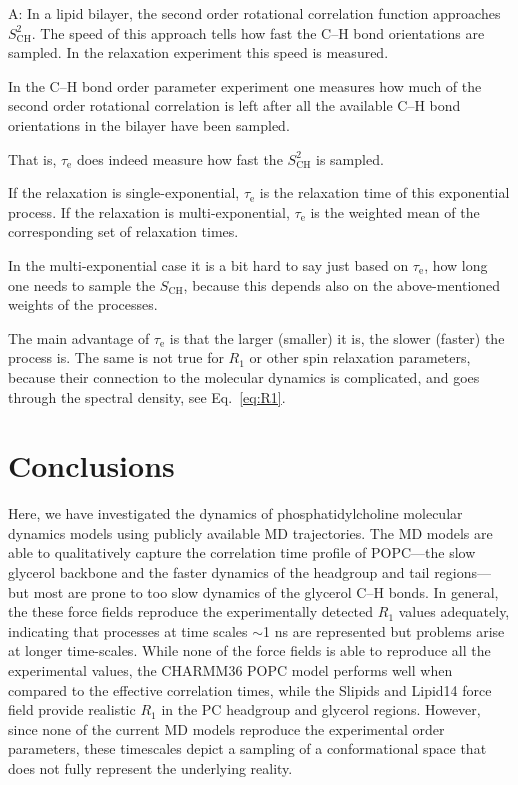 \documentclass[journal=jpcbfk,manuscript=article,layout=twocolumn]{achemso}
\begin{document}
A: In a lipid bilayer, the second order rotational correlation function approaches $S^2_\mathrm{CH}$. The speed of this approach tells how fast the C--H bond orientations are sampled. In the relaxation experiment this speed is measured.

In the C--H bond order parameter experiment one measures how much of the second order rotational correlation is left after all the available C--H bond orientations in the bilayer have been sampled.

That is,  $\tau_\mathrm e$ does indeed measure how fast the $S^2_\mathrm{CH}$ is sampled.

If the relaxation is single-exponential, $\tau_\mathrm e$ is the relaxation time of this exponential process. If the relaxation is multi-exponential, $\tau_\mathrm e$ is the weighted mean of the corresponding set of relaxation times.

In the multi-exponential case it is a bit hard to say just based on $\tau_\mathrm e$, how long one needs to sample the $S_\mathrm{CH}$, because this depends also on the above-mentioned weights of the processes.

The main advantage of $\tau_\mathrm e$ is that the larger (smaller) it is, the slower (faster) the process is. The same is not true for $R_1$ or other spin relaxation parameters, because their connection to the molecular dynamics is complicated, and goes through the spectral density, see Eq.~\eqref{eq:R1}.

\section{Conclusions}

Here, we have investigated the dynamics of phosphatidylcholine molecular dynamics models using publicly available MD trajectories. The MD models are able to qualitatively capture the correlation time profile of POPC---the slow glycerol backbone and the faster dynamics of the headgroup and tail regions---but most are prone to too slow dynamics of the glycerol C--H bonds.  In general, the these force fields reproduce the experimentally detected $R_{1}$ values adequately, indicating that processes at time scales $\sim$1 ns are represented but problems arise at longer time-scales. While none of the force fields is able to reproduce all the experimental values, the CHARMM36 POPC model performs well when compared to the effective correlation times, while the Slipids and Lipid14 force field provide realistic $R_{1}$ in the PC headgroup and glycerol regions. However, since none of the current MD models reproduce the experimental order parameters, these timescales depict a sampling of a conformational space that does not fully represent the underlying reality.
\end{document}

